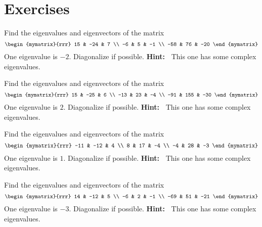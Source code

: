 \section*{Exercises}


\begin{ex} Find the eigenvalues and eigenvectors of the matrix
\begin{equation*}
\begin{mymatrix}{rrr}
15 & -24 & 7 \\
-6 & 5 & -1 \\
-58 & 76 & -20
\end{mymatrix}
\end{equation*}
One eigenvalue is $-2. $ Diagonalize if possible. \textbf{Hint:\ }
This one has some complex eigenvalues.
\end{ex}

\begin{ex} Find the eigenvalues and eigenvectors of the matrix
\begin{equation*}
\begin{mymatrix}{rrr}
15 & -25 & 6 \\
-13 & 23 & -4 \\
-91 & 155 & -30
\end{mymatrix}
\end{equation*}
One eigenvalue is $2$. Diagonalize if possible. \textbf{Hint:\ }
This one has some complex eigenvalues.
\end{ex}

\begin{ex} Find the eigenvalues and eigenvectors of the matrix
\begin{equation*}
\begin{mymatrix}{rrr}
-11 & -12 & 4 \\
8 & 17 & -4 \\
-4 & 28 & -3
\end{mymatrix}
\end{equation*}
One eigenvalue is $1$. Diagonalize if possible. \textbf{Hint:\ }
This one has some complex eigenvalues.
\end{ex}

\begin{ex} Find the eigenvalues and eigenvectors of the matrix
\begin{equation*}
\begin{mymatrix}{rrr}
14 & -12 & 5 \\
-6 & 2 & -1 \\
-69 & 51 & -21
\end{mymatrix}
\end{equation*}
One eigenvalue is $-3$. Diagonalize if possible. \textbf{Hint:\ }
This one has some complex eigenvalues.
\end{ex}

